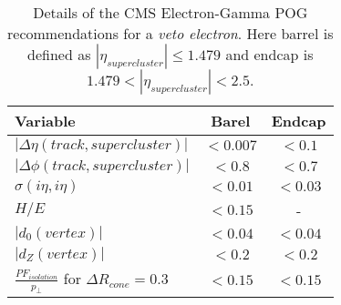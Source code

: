 \begin{table}[!htp]
\centering
\begin{tabular}{|l|c|c|}
\hline
Variable & Barel & Endcap \\
\hline\hline
$| \Delta\eta(track,supercluster) |$ & $<0.007$ & $<0.1$  \\
$| \Delta\phi(track,supercluster) |$ & $<0.8  $ & $<0.7$  \\
$ \sigma(i\eta,i\eta)$               & $<0.01 $ & $<0.03$ \\
$H/E$                                & $<0.15 $ &       - \\
$|d_{0}(vertex)|$                    & $<0.04 $ & $<0.04$ \\
$|d_{Z}(vertex)|$                    & $<0.2  $ & $<0.2 $ \\
$\frac{PF_{isolation}}{p_{\perp}}$ for $ \Delta R_{cone}=0.3$  & $<0.15 $ & $<0.15$ \\
\hline
\end{tabular}
\caption[Details of the CMS Electron-Gamma POG recommendations for a \textit{veto electron}.]
{Details of the \gls{CMS} Electron-Gamma \gls{POG} recommendations for a \textit{veto electron}. Here barrel is defined as $ |\eta_{supercluster}| \leq 1.479 $ and endcap is $ 1.479 < |\eta_{supercluster}| < 2.5 $.} 
\label{TABLE:PhysicsObjects_ElectronPOG_CutBased_VetoElectronRequirements}
\end{table}
